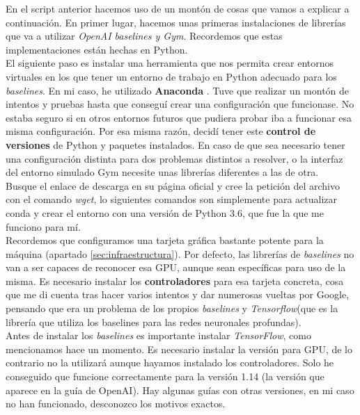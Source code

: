 \documentclass[11pt,fleqn]{book} %
\begin{document}
En el script anterior hacemos uso de un montón de cosas que vamos a explicar a continuación. En primer lugar, hacemos unas primeras instalaciones de librerías que va a utilizar \textit{OpenAI baselines y Gym}. Recordemos que estas implementaciones están hechas en Python. \\

El siguiente paso es instalar una herramienta que nos permita crear entornos virtuales en los que tener un entorno de trabajo en Python adecuado para los \textit{baselines}. En mi caso, he utilizado \textbf{Anaconda} \cite{article:anaconda}. Tuve que realizar un montón de intentos y pruebas hasta que conseguí crear una configuración que funcionase. No estaba seguro si en otros entornos futuros que pudiera probar iba a funcionar esa misma configuración. Por esa misma razón, decidí tener este \textbf{control de versiones} de Python y paquetes instalados. En caso de que sea necesario tener una configuración distinta para dos problemas distintos a resolver, o la interfaz del entorno simulado Gym necesite unas librerías diferentes a las de otra. \\

Busque el enlace de descarga en su página oficial y cree la petición del archivo con el comando \textit{wget}, lo siguientes comandos son simplemente para actualizar conda y crear el entorno con una versión de Python 3.6, que fue la que me funciono para mí. \\

Recordemos que configuramos una tarjeta gráfica bastante potente para la máquina (apartado \ref{sec:infraestructura}). Por defecto, las librerías de \textit{baselines} no van a ser capaces de reconocer esa GPU, aunque sean específicas para uso de la misma. Es necesario instalar los \textbf{controladores} para esa tarjeta concreta, cosa que me di cuenta tras hacer varios intentos y dar numerosas vueltas por Google, pensando que era un problema de los propios \textit{baselines} y \textit{Tensorflow}(que es la librería que utiliza los baselines para las redes neuronales profundas)\cite{article:tensorflow}.\\

Antes de instalar los \textit{baselines} es importante instalar \textit{TensorFlow}, como mencionamos hace un momento. Es necesario instalar la versión para GPU, de lo contrario no la utilizará aunque hayamos instalado los controladores. Solo he conseguido que funcione correctamente para la versión 1.14 (la versión que aparece en la guía de OpenAI\cite{article:baselines}). Hay algunas guías con otras versiones, en mi caso no han funcionado, desconozco los motivos exactos. \\
\end{document}
